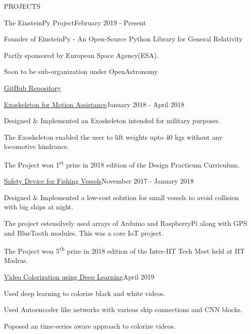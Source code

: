 \documentclass{resume} %
\begin{document}
\begin{rSection}{PROJECTS} 

\begin{rSubsection}{The EinsteinPy Project}{February 2019 - Present}{}{}
\item Founder of EinsteinPy - An Open-Source Python Library for General Relativity
\item Partly sponsored by European Space Agency(ESA).
\item Soon to be sub-organization under OpenAstronomy
\item \href{https://github.com/einsteinpy/einsteinpy}{GitHub Repository}
\end{rSubsection}

\begin{rSubsection}{\href{https://github.com/ritzvik/Miscellaneous-Projects/blob/master/design_practicum.pdf}{Exoskeleton for Motion Assistance}}{January 2018 - April 2018}{}{}
\item Designed \& Implemented an Exoskeleton intended for military purposes.
\item The Exoskeleton enabled the user to lift weights upto 40 kgs without any locomotive hindrance.
\item The Project won 1\textsuperscript{st} prize in 2018 edition of the Design Practicum Curriculum.
\end{rSubsection}

\begin{rSubsection}{\href{https://github.com/ritzvik/Miscellaneous-Projects/blob/master/techmeet.pdf}{Safety Device for Fishing Vessels}}{November 2017 - January 2018}{}{}
\item Designed \& Implemented a low-cost solution for small vessels to avoid
collision with big ships at night.
\item The project estensilvely used arrays of Arduino and RaspberryPi along with GPS and BlueTooth modules. This was a core IoT project.
\item The Project won 5\textsuperscript{th} prize in 2018 edition of the Inter-IIT Tech Meet held at IIT Madras.
\end{rSubsection}

\begin{rSubsection}{\href{https://github.com/ritzvik/DL-Video-Colorization}{Video Colorization using Deep Learning}}{April 2019}{}{}
\item Used deep learning to colorize black and white videos.
\item Used Autoencoder like networks with various skip connections and CNN blocks.
\item Poposed an time-series aware approach to colorize videos.
\end{rSubsection}

\end{rSection}
\end{document}
